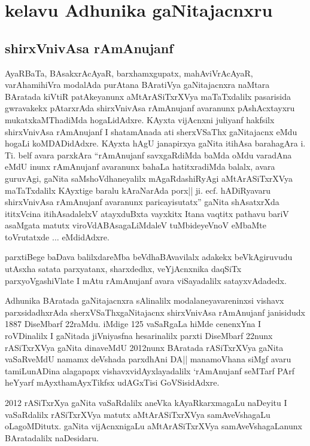 \chapter{kelavu Adhunika gaNitajacnxru}

\section{shirxVnivAsa rAmAnujanf}


AyaRBaTa, BAsakxrAcAyaR, barxhamxgupatx, mahAviVrAcAyaR, varAhamihiVra modalAda purAtana BAratiVya gaNitajacnxra naMtara BAratada kiVtiR patAkeyanunx aMtArASiTxrXVya maTaTxdalilx pasarisida gwravakekx pAtarxrAda shirxVnivAsa rAmAnujanf avaranunx pAshAcxtayxru mukatxkaMThadiMda hogaLidAdxre. KAyxta vijAcnxni juliyanf hakfsilx shirxVnivAsa rAmAnujanf I shatamAnada ati sherxVSaThx gaNitajacnx eMdu hogaLi koMDADidAdxre. KAyxta hAgU janapirxya gaNita itihAsa barahagAra i. Ti. belf avara parxkAra ``rAmAnujanf savxgaRdiMda baMda oMdu varadAna eMdU inunx rAmAnujanf avaranunx bahaLa hatitxradiMda balalx, avara guruvAgi, gaNita saMshoVdhaneyalilx mAgaRdashiRyAgi aMtArASiTxrXVya maTaTxdalilx KAyxtige baralu kAraNarAda porx|| ji. ecf. hADiRyavaru shirxVnivAsa rAmAnujanf avaranunx paricayisutatx'' gaNita shAsatxrXda ititxVcina itihAsadalelxV atayxduBxta vayxkitx Itana vaqtitx pathavu bariV asaMgata matutx viroVdABAsagaLiMdaleV tuMbideyeVnoV eMbaMte toVrutatxde $\ldots$ eMdidAdxre.

parxtiBege baDava balilxdareMba beVdhaBAvavilalx adakekx beVkAgiruvudu utAsxha satata parxyatanx, sharxdedhx, veYjAcnxnika daqSiTx parxyoVgashiVlate I mAtu rAmAnujanf avara viSayadalilx satayxvAdadedx.

Adhunika BAratada gaNitajacnxra sAlinalilx modalaneyavareninxsi vishavx parxsidadhxrAda sherxVSaThxgaNitajacnx shirxVnivAsa rAmAnujanf janisidudx {\rm 1887} DiseMbarf {\rm 22}raMdu. iMdige {\rm 125} vaSaRgaLa hiMde cenenxYna I roVDinalilx I gaNitada jiVniyasfna hesarinalilx parxti DiseMbarf {\rm 22}nunx rASiTxrXVya gaNita dinaveMdU {\rm 2012}nunx BAratada rASiTxrXVya gaNita vaSaRveMdU namamx deVshada parxdhAni DA|| manamoVhana siMgf avaru tamiLunADina alagapapx vishavxvidAyxlayadalilx `rAmAnujanf seMTarf PArf heYyarf mAyxthamAyxTikfsx udAGxTisi GoVSisidAdxre.

{\rm 2012} rASiTxrXya gaNita vaSaRdalilx aneVka kAyaRkarxmagaLu naDeyitu I vaSaRdalilx rASiTxrXVya matutx aMtArASiTxrXVya samAveVshagaLu oLagoMDitutx. gaNita vijAcnxnigaLu aMtArASiTxrXVya samAveVshagaLanunx BAratadalilx naDesidaru.


